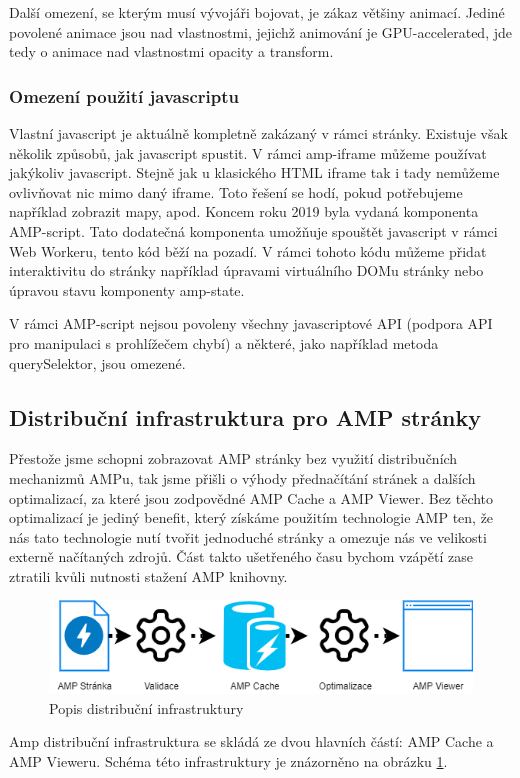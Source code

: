 Další omezení, se kterým musí vývojáři bojovat, je zákaz většiny animací. Jediné povolené animace jsou nad vlastnostmi, jejichž animování je GPU-accelerated, jde tedy o animace nad vlastnostmi opacity a transform\cite{AMPCss}.

\subsubsection*{Omezení použití javascriptu}
Vlastní javascript je aktuálně kompletně zakázaný v rámci stránky. Existuje však několik způsobů, jak javascript spustit.
V rámci amp-iframe můžeme používat jakýkoliv javascript. Stejně jak u klasického HTML iframe tak i tady nemůžeme ovlivňovat nic mimo daný iframe. Toto řešení se hodí, pokud potřebujeme například zobrazit mapy, apod.
Koncem roku 2019 byla vydaná komponenta AMP-script. Tato dodatečná komponenta umožňuje spouštět javascript v rámci Web Workeru, tento kód běží na pozadí. V rámci tohoto kódu můžeme přidat interaktivitu do stránky například úpravami virtuálního DOMu stránky nebo úpravou stavu komponenty amp-state.

V rámci AMP-script nejsou povoleny všechny javascriptové API (podpora API pro manipulaci s prohlížečem chybí) a některé, jako například metoda querySelektor, jsou omezené\cite{amp-script}.

\subsection*{Distribuční infrastruktura pro AMP stránky}

Přestože jsme schopni zobrazovat AMP stránky bez využití distribučních mechanizmů AMPu, tak jsme přišli o výhody přednačítání stránek a dalších optimalizací, za které jsou zodpovědné AMP Cache a AMP Viewer.
Bez těchto optimalizací je jediný benefit, který získáme použitím technologie AMP ten, že nás tato technologie nutí tvořit jednoduché stránky a omezuje nás ve velikosti externě načítaných zdrojů. Část takto ušetřeného času bychom vzápětí zase ztratili kvůli nutnosti stažení AMP knihovny.

\begin{figure}[hbt]
	\centering
	\includegraphics[width=1\textwidth]{obrazky-figures/AmpDistribuce.png}
	\caption{Popis distribuční infrastruktury}
	\label{Popis Distribuční infrastruktury AMP}
\end{figure}
Amp distribuční infrastruktura se skládá ze dvou hlavních částí: AMP Cache a AMP Vieweru. Schéma této infrastruktury je znázorněno na obrázku \ref{Popis Distribuční infrastruktury AMP}.

